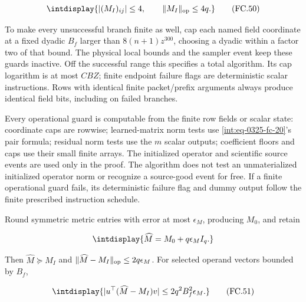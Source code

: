 \begingroup\renewcommand{\theHequation}{intdisplay.755}
\begin{equation}
\intdisplay{
|(M_I)_{ij}|\le4,\qquad \|M_I\|_{\rm op}\le4q.
}
\tag{FC.50}
\label{int:eq-0355-fc-50}
\end{equation}
\endgroup


To make every unsuccessful branch finite as well, cap each named field coordinate at a fixed dyadic \(B_f\) larger than \(8(n+1)z^{300}\), choosing a dyadic within a factor two of that bound. The physical local bounds and the sampler event keep these guards inactive. Off the successful range this specifies a total algorithm. Its cap logarithm is at most \(CBZ\); finite endpoint failure flags are deterministic scalar instructions. Rows with identical finite packet/prefix arguments always produce identical field bits, including on failed branches.



Every operational guard is computable from the finite row fields or scalar state: coordinate caps are rowwise; learned-matrix norm tests use \eqref{int:eq-0325-fc-20}'s pair formula; residual norm tests use the \(m\) scalar outputs; coefficient floors and caps use their small finite arrays. The initialized operator and scientific source events are used only in the proof. The algorithm does not test an unmaterialized initialized operator norm or recognize a source-good event for free. If a finite operational guard fails, its deterministic failure flag and dummy output follow the finite prescribed instruction schedule.



Round symmetric metric entries with error at most \(\epsilon_M\), producing \(M_0\), and retain


\begingroup\renewcommand{\theHequation}{intdisplay.756}
\begin{equation*}
\intdisplay{
\widehat M=M_0+q\epsilon_MI_q.
}
\end{equation*}
\endgroup


Then \(\widehat M\succeq M_I\) and \(\|\widehat M-M_I\|_{\rm op}\le2q\epsilon_M\). For selected operand vectors bounded by \(B_f\),


\begingroup\renewcommand{\theHequation}{intdisplay.757}
\begin{equation}
\intdisplay{
|u^\top(\widehat M-M_I)v|\le2q^2B_f^2\epsilon_M.
}
\tag{FC.51}
\label{int:eq-0356-fc-51}
\end{equation}
\endgroup

